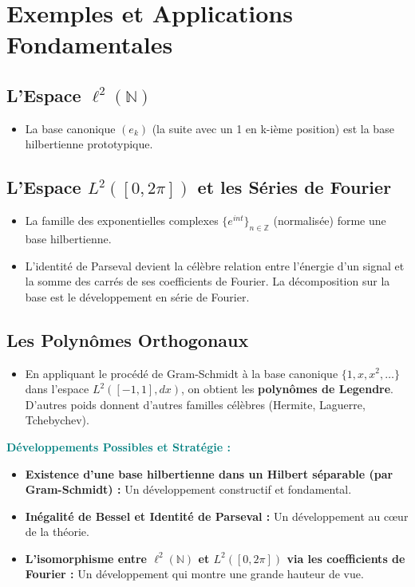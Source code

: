 \documentclass[12pt, a4paper, parskip=full]{report}
\theoremstyle{agregstyle}
\newenvironment{developpements}
  {\par\medskip\noindent\begin{oframed}\noindent\textbf{\textcolor{teal}{Développements Possibles et Stratégie :}}}
  {\end{oframed}\par\medskip}
\begin{document}
\section{Exemples et Applications Fondamentales}
\subsection{L'Espace $\ell^2(\mathbb{N})$}
\begin{itemize}
    \item La base canonique $(e_k)$ (la suite avec un 1 en k-ième position) est la base hilbertienne prototypique.
\end{itemize}
\subsection{L'Espace $L^2([0, 2\pi])$ et les Séries de Fourier}
\begin{itemize}
    \item La famille des exponentielles complexes $\{e^{int}\}_{n \in \mathbb{Z}}$ (normalisée) forme une base hilbertienne.
    \item L'identité de Parseval devient la célèbre relation entre l'énergie d'un signal et la somme des carrés de ses coefficients de Fourier. La décomposition sur la base est le développement en série de Fourier.
\end{itemize}
\subsection{Les Polynômes Orthogonaux}
\begin{itemize}
    \item En appliquant le procédé de Gram-Schmidt à la base canonique $\{1, x, x^2, \dots\}$ dans l'espace $L^2([-1,1], dx)$, on obtient les \textbf{polynômes de Legendre}. D'autres poids donnent d'autres familles célèbres (Hermite, Laguerre, Tchebychev).
\end{itemize}

\begin{developpements}
    \begin{itemize}
        \item \textbf{Existence d'une base hilbertienne dans un Hilbert séparable (par Gram-Schmidt) :} Un développement constructif et fondamental.
        \item \textbf{Inégalité de Bessel et Identité de Parseval :} Un développement au cœur de la théorie.
        \item \textbf{L'isomorphisme entre $\ell^2(\mathbb{N})$ et $L^2([0,2\pi])$ via les coefficients de Fourier :} Un développement qui montre une grande hauteur de vue.
    \end{itemize}
\end{developpements}
\end{document}
